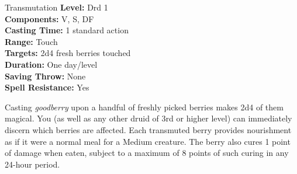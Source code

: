 {Transmutation}
{
	\textbf{Level:}
	Drd 1\\
	\textbf{Components:}
	V, S, DF\\
	\textbf{Casting Time:}
	1 standard action\\
	\textbf{Range:}
	Touch\\
	\textbf{Targets:}
	2d4 fresh berries touched\\
	\textbf{Duration:}
	One day/level\\
	\textbf{Saving Throw:}
	None\\
	\textbf{Spell Resistance:}
	Yes\\
}
{
	Casting \emph{goodberry} upon a handful of freshly picked berries makes 2d4 of them magical. You (as well as any other druid of 3rd or higher level) can immediately discern which berries are affected. Each transmuted berry provides nourishment as if it were a normal meal for a Medium creature. The berry also cures 1 point of damage when eaten, subject to a maximum of 8 points of such curing in any 24-hour period.

}
